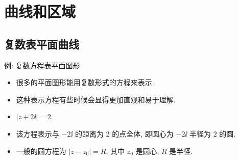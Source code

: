 \section{曲线和区域}


\subsection{复数表平面曲线}


\begin{frame}{例: 复数方程表平面图形}
	\begin{itemize}
		\item 很多的平面图形能用复数形式的方程来表示.
		\item 这种表示方程有些时候会显得更加直观和易于理解.
	\end{itemize}
	\onslide<+->
	\begin{example}[sidepic,righthand width=3.3cm,leftupper=0mm]
		\begin{itemize}
			\item $|z+2\ii|=2$.
			\item 该方程表示与 $-2\ii $ 的距离为 $2$ 的点全体, 即圆心为 $-2\ii $ 半径为 $2$ 的圆.
			\item 一般的圆方程为 $|z-z_0|=R$, 其中 $z_0$ 是圆心, $R$ 是半径.
		\end{itemize}
		\tcblower
	\end{example}
\end{frame}


